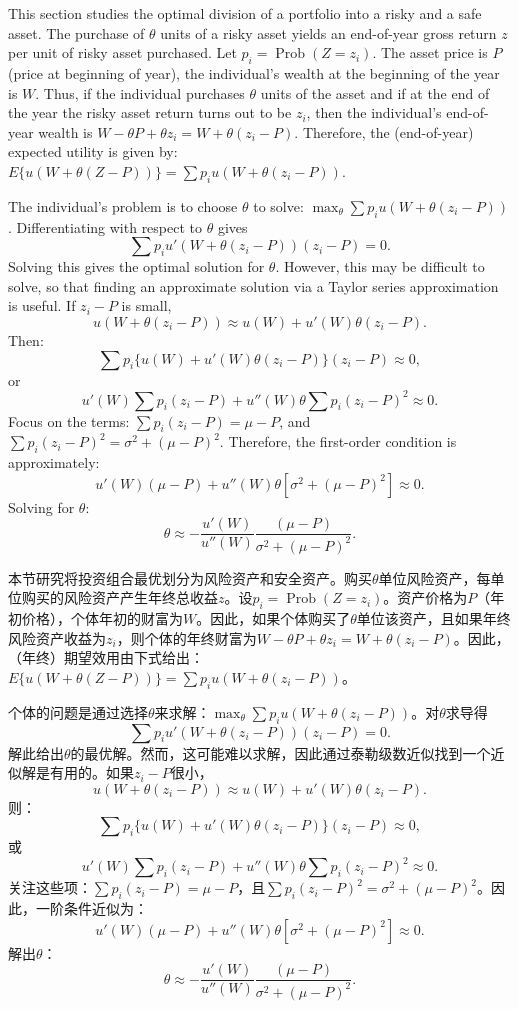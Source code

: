 \begin{original}
This section studies the optimal division of a portfolio into a risky and a safe asset. The purchase of $\theta$ units of a risky asset yields an end-of-year gross return $z$ per unit of risky asset purchased. Let $p_i = \operatorname{Prob}(Z = z_i)$. The asset price is $P$ (price at beginning of year), the individual's wealth at the beginning of the year is $W$. Thus, if the individual purchases $\theta$ units of the asset and if at the end of the year the risky asset return turns out to be $z_i$, then the individual's end-of-year wealth is $W - \theta P + \theta z_i = W + \theta(z_i - P)$. Therefore, the (end-of-year) expected utility is given by: $E\{u(W + \theta(Z - P))\} = \sum p_i u(W + \theta(z_i - P))$.

The individual's problem is to choose $\theta$ to solve: $\max_\theta \sum p_i u(W + \theta(z_i - P))$. Differentiating with respect to $\theta$ gives
\[
\sum p_i u'(W + \theta(z_i - P))(z_i - P) = 0.
\]
Solving this gives the optimal solution for $\theta$. However, this may be difficult to solve, so that finding an approximate solution via a Taylor series approximation is useful. If $z_i - P$ is small,
\[
u(W + \theta(z_i - P)) \approx u(W) + u'(W)\theta(z_i - P).
\]
Then:
\[
\sum p_i\{u(W) + u'(W)\theta(z_i - P)\}(z_i - P) \approx 0,
\]
or
\[
u'(W)\sum p_i(z_i - P) + u''(W)\theta\sum p_i(z_i - P)^2 \approx 0.
\]
Focus on the terms: $\sum p_i(z_i - P) = \mu - P$, and $\sum p_i(z_i - P)^2 = \sigma^2 + (\mu - P)^2$. Therefore, the first-order condition is approximately:
\[
u'(W)(\mu - P) + u''(W)\theta[\sigma^2 + (\mu - P)^2] \approx 0.
\]
Solving for $\theta$:
\[
\theta \approx -\frac{u'(W)}{u''(W)} \frac{(\mu - P)}{\sigma^2 + (\mu - P)^2}.
\]
\end{original}
\begin{translation}
本节研究将投资组合最优划分为风险资产和安全资产。购买$\theta$单位风险资产，每单位购买的风险资产产生年终总收益$z$。设$p_i = \operatorname{Prob}(Z = z_i)$。资产价格为$P$（年初价格），个体年初的财富为$W$。因此，如果个体购买了$\theta$单位该资产，且如果年终风险资产收益为$z_i$，则个体的年终财富为$W - \theta P + \theta z_i = W + \theta(z_i - P)$。因此，（年终）期望效用由下式给出：$E\{u(W + \theta(Z - P))\} = \sum p_i u(W + \theta(z_i - P))$。

个体的问题是通过选择$\theta$来求解：$\max_\theta \sum p_i u(W + \theta(z_i - P))$。对$\theta$求导得
\[
\sum p_i u'(W + \theta(z_i - P))(z_i - P) = 0.
\]
解此给出$\theta$的最优解。然而，这可能难以求解，因此通过泰勒级数近似找到一个近似解是有用的。如果$z_i - P$很小，
\[
u(W + \theta(z_i - P)) \approx u(W) + u'(W)\theta(z_i - P).
\]
则：
\[
\sum p_i\{u(W) + u'(W)\theta(z_i - P)\}(z_i - P) \approx 0,
\]
或
\[
u'(W)\sum p_i(z_i - P) + u''(W)\theta\sum p_i(z_i - P)^2 \approx 0.
\]
关注这些项：$\sum p_i(z_i - P) = \mu - P$，且$\sum p_i(z_i - P)^2 = \sigma^2 + (\mu - P)^2$。因此，一阶条件近似为：
\[
u'(W)(\mu - P) + u''(W)\theta[\sigma^2 + (\mu - P)^2] \approx 0.
\]
解出$\theta$：
\[
\theta \approx -\frac{u'(W)}{u''(W)} \frac{(\mu - P)}{\sigma^2 + (\mu - P)^2}.
\]
\end{translation}

